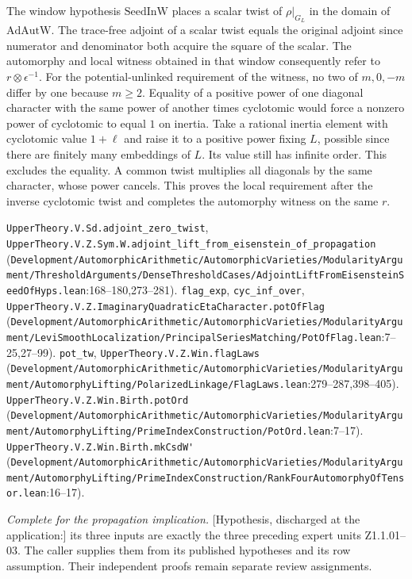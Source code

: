 The window hypothesis $\mathrm{SeedInW}$ places a scalar twist of $\rho|_{G_L}$ in the domain of $\mathrm{AdAutW}$. The trace-free adjoint of a scalar twist equals the original adjoint since numerator and denominator both acquire the square of the scalar. The automorphy and local witness obtained in that window consequently refer to $r\otimes\epsilon^{-1}$. For the potential-unlinked requirement of the witness, no two of $m,0,-m$ differ by one because $m\ge2$. Equality of a positive power of one diagonal character with the same power of another times cyclotomic would force a nonzero power of cyclotomic to equal $1$ on inertia. Take a rational inertia element with cyclotomic value $1+\ell$ and raise it to a positive power fixing $L$, possible since there are finitely many embeddings of $L$. Its value still has infinite order. This excludes the equality. A common twist multiplies all diagonals by the same character, whose power cancels. This proves the local requirement after the inverse cyclotomic twist and completes the automorphy witness on the same $r$.

{\footnotesize \nolinkurl{UpperTheory.V.Sd.adjoint_zero_twist}, \nolinkurl{UpperTheory.V.Z.Sym.W.adjoint_lift_from_eisenstein_of_propagation} (\nolinkurl{Development/AutomorphicArithmetic/AutomorphicVarieties/ModularityArgument/ThresholdArguments/DenseThresholdCases/AdjointLiftFromEisensteinSeedOfHyps.lean}\allowbreak:168--180,273--281). \nolinkurl{flag_exp}, \nolinkurl{cyc_inf_over}, \nolinkurl{UpperTheory.V.Z.ImaginaryQuadraticEtaCharacter.potOfFlag} (\nolinkurl{Development/AutomorphicArithmetic/AutomorphicVarieties/ModularityArgument/LeviSmoothLocalization/PrincipalSeriesMatching/PotOfFlag.lean}\allowbreak:7--25,27--99). \nolinkurl{pot_tw}, \nolinkurl{UpperTheory.V.Z.Win.flagLaws} (\nolinkurl{Development/AutomorphicArithmetic/AutomorphicVarieties/ModularityArgument/AutomorphyLifting/PolarizedLinkage/FlagLaws.lean}\allowbreak:279--287,398--405). \nolinkurl{UpperTheory.V.Z.Win.Birth.potOrd} (\nolinkurl{Development/AutomorphicArithmetic/AutomorphicVarieties/ModularityArgument/AutomorphyLifting/PrimeIndexConstruction/PotOrd.lean}\allowbreak:7--17). \nolinkurl{UpperTheory.V.Z.Win.Birth.mkCsdW'} (\nolinkurl{Development/AutomorphicArithmetic/AutomorphicVarieties/ModularityArgument/AutomorphyLifting/PrimeIndexConstruction/RankFourAutomorphyOfTensor.lean}\allowbreak:16--17).}

\emph{Complete for the propagation implication.} [Hypothesis, discharged at the application:] its three inputs are exactly the three preceding expert units Z1.1.01--03. The caller supplies them from its published hypotheses and its row assumption. Their independent proofs remain separate review assignments.


